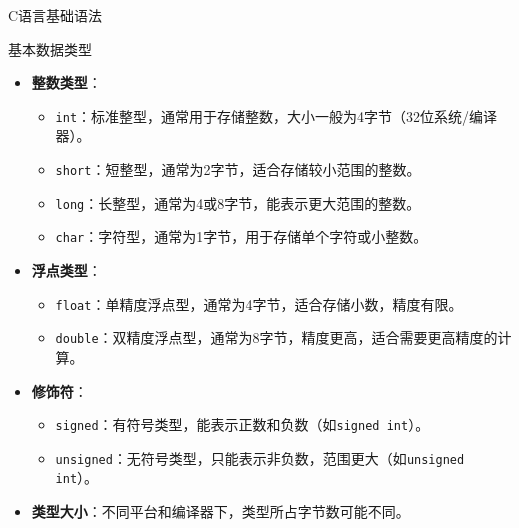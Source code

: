 \documentclass[UTF8,aspectratio=169]{beamer}
\begin{document}
\begin{frame}{C语言基础语法}
    \begin{ytublock}{基本数据类型}
        \begin{itemize}
            \item \textbf{整数类型}：
            \begin{itemize}
                \item \texttt{int}：标准整型，通常用于存储整数，大小一般为4字节（32位系统/编译器）。
                \item \texttt{short}：短整型，通常为2字节，适合存储较小范围的整数。
                \item \texttt{long}：长整型，通常为4或8字节，能表示更大范围的整数。
                \item \texttt{char}：字符型，通常为1字节，用于存储单个字符或小整数。
            \end{itemize}
            \item \textbf{浮点类型}：
            \begin{itemize}
                \item \texttt{float}：单精度浮点型，通常为4字节，适合存储小数，精度有限。
                \item \texttt{double}：双精度浮点型，通常为8字节，精度更高，适合需要更高精度的计算。
            \end{itemize}
            \item \textbf{修饰符}：
            \begin{itemize}
                \item \texttt{signed}：有符号类型，能表示正数和负数（如\texttt{signed int}）。
                \item \texttt{unsigned}：无符号类型，只能表示非负数，范围更大（如\texttt{unsigned int}）。
            \end{itemize}
            \item \textbf{类型大小}：不同平台和编译器下，类型所占字节数可能不同。
        \end{itemize}
    \end{ytublock}
\end{frame}
\end{document}
